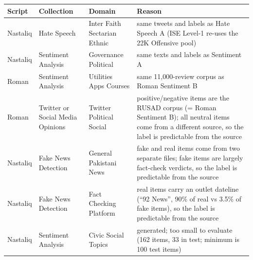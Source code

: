 \begin{tabular}{lllp{6.0cm}}
\toprule
Script & Collection & Domain & Reason \\
\midrule
Nastaliq & Hate Speech & Inter Faith Sectarian Ethnic & same tweets and labels as Hate Speech A (ISE Level-1 re-uses the 22K Offensive pool) \\
Nastaliq & Sentiment Analysis & Governance Political & same texts and labels as Sentiment A \\
Roman & Sentiment Analysis & Utilities Apps Courses & same 11,000-review corpus as Roman Sentiment B \\
Roman & Twitter or Social Media Opinions & Twitter Political Social & positive/negative items are the RUSAD corpus (= Roman Sentiment B); all neutral items come from a different source, so the label is predictable from the source \\
Nastaliq & Fake News Detection & General Pakistani News & fake and real items come from two separate files; fake items are largely fact-check verdicts, so the label is predictable from the source \\
Nastaliq & Fake News Detection & Fact Checking Platform & real items carry an outlet dateline (``92 News'', 90\% of real vs 3.5\% of fake items), so the label is predictable from the source \\
Nastaliq & Sentiment Analysis & Civic Social Topics & generated; too small to evaluate (162 items, 33 in test; minimum is 100 test items) \\
\bottomrule
\end{tabular}
